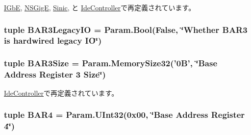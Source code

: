 \hyperlink{classEthernet_1_1IGbE_a0b8b6594cd17a42ee6f2bded401213d9}{IGbE}, \hyperlink{classEthernet_1_1NSGigE_a0b8b6594cd17a42ee6f2bded401213d9}{NSGigE}, \hyperlink{classEthernet_1_1Sinic_a0b8b6594cd17a42ee6f2bded401213d9}{Sinic}, と \hyperlink{classIde_1_1IdeController_a0b8b6594cd17a42ee6f2bded401213d9}{IdeController}で再定義されています。\hypertarget{classPci_1_1PciDevice_a9b177ee7fb609f562787c06b9c0bef3e}{
\subsubsection[{BAR3LegacyIO}]{\setlength{\rightskip}{0pt plus 5cm}tuple {\bf BAR3LegacyIO} = Param.Bool(False, \char`\"{}Whether {\bf BAR3} is hardwired legacy IO\char`\"{})}}
\label{classPci_1_1PciDevice_a9b177ee7fb609f562787c06b9c0bef3e}
\hypertarget{classPci_1_1PciDevice_ae04afc140f2d94d97e67855d3ddffe3e}{
\subsubsection[{BAR3Size}]{\setlength{\rightskip}{0pt plus 5cm}tuple {\bf BAR3Size} = Param.MemorySize32('0B', \char`\"{}Base Address Register 3 Size\char`\"{})}}
\label{classPci_1_1PciDevice_ae04afc140f2d94d97e67855d3ddffe3e}


\hyperlink{classIde_1_1IdeController_ab4d963f74d5c8e1d6915a406f94a094b}{IdeController}で再定義されています。\hypertarget{classPci_1_1PciDevice_a50a34d2b9855ad231f8b6dab39c0641a}{
\subsubsection[{BAR4}]{\setlength{\rightskip}{0pt plus 5cm}tuple {\bf BAR4} = Param.UInt32(0x00, \char`\"{}Base Address Register 4\char`\"{})}}
\label{classPci_1_1PciDevice_a50a34d2b9855ad231f8b6dab39c0641a}


